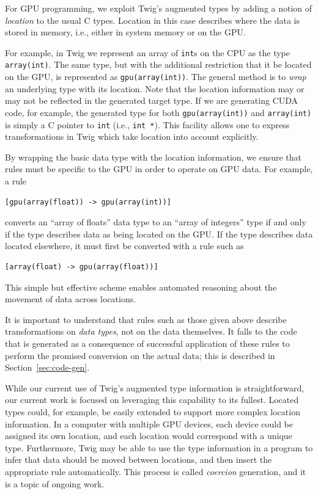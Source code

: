 For GPU programming, we exploit Twig's augmented types by adding a notion of
\emph{location} to the usual C types. Location in this case describes where the
data is stored in memory, i.e., either in system memory or on the GPU.

For example, in Twig we represent an array of \texttt{int}s on the CPU as the
type \texttt{array(int)}. The same type, but with the additional restriction
that it be located on the GPU, is represented as \texttt{gpu(array(int))}. The
general method is to \emph{wrap} an underlying type with its location. Note that
the location information may or may not be reflected in the generated target
type. If we are generating CUDA code, for example, the generated type for both
\texttt{gpu(array(int))} and \texttt{array(int)} is simply a C pointer to
\texttt{int} (i.e., \texttt{int *}). This facility allows one to express
transformations in Twig which take location into account explicitly.

By wrapping the basic data type with the location information, we ensure that
rules must be specific to the GPU in order to operate on GPU data. For example,
a rule

\begin{verbatim}
[gpu(array(float)) -> gpu(array(int))]
\end{verbatim}

converts an ``array of floats'' data type to an ``array of integers'' type if
and only if the type describes data as being located on the GPU. If the type
describes data located elsewhere, it must first be converted with a rule such as

\begin{verbatim}
[array(float) -> gpu(array(float))]
\end{verbatim}

This simple but effective scheme enables automated reasoning about the movement
of data across locations.

It is important to understand that rules such as those given above describe
transformations on \emph{data types}, not on the data themselves. It falls to
the code that is generated as a consequence of successful application of these
rules to perform the promised conversion on the actual data; this is described
in Section~\ref{sec:code-gen}.

While our current use of Twig's augmented type information is straightforward,
our current work is focused on leveraging this capability to its fullest.
Located types could, for example, be easily extended to support more complex
location information. In a computer with multiple GPU devices, each device could
be assigned its own location, and each location would correspond with a unique
type. Furthermore, Twig may be able to use the type information in a program to
infer that data should be moved between locations, and then insert the
appropriate rule automatically. This process is called \emph{coercion}
generation, and it is a topic of ongoing work.
